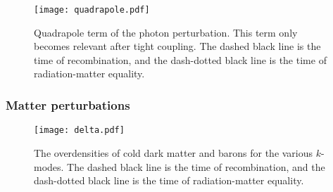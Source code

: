     \begin{figure}
        \texttt{[image: quadrapole.pdf]}
        \caption{Quadrapole term of the photon perturbation. This term only becomes relevant after tight coupling. The dashed black line is the time of recombination, and the dash-dotted black line is the time of radiation-matter equality.}
        \label{fig:m3:quadrapole}
    \end{figure}

\subsubsection{Matter perturbations}


    \begin{figure}
        \texttt{[image: delta.pdf]}
        \caption{The overdensities of cold dark matter and barons for the various $k$-modes. The dashed black line is the time of recombination, and the dash-dotted black line is the time of radiation-matter equality.}
        \label{fig:m3:delta}
    \end{figure}

